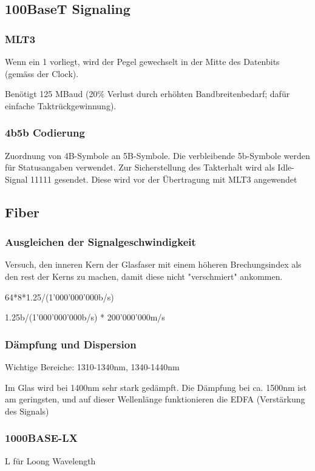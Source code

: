 \begin{multicols}{2}
\subsection{100BaseT Signaling}

\subsubsection{MLT3}
	Wenn ein 1 vorliegt, wird der Pegel gewechselt in der Mitte des Datenbits (gemäss der Clock).
	
	Benötigt 125 MBaud (20\% Verlust durch erhöhten Bandbreitenbedarf; dafür einfache Taktrückgewinnung).
	
\subsubsection{4b5b Codierung}
	Zuordnung von 4B-Symbole an 5B-Symbole. Die verbleibende 5b-Symbole werden für Statusangaben verwendet.
	Zur Sicherstellung des Takterhalt wird als Idle-Signal 11111 gesendet.
	Diese wird vor der Übertragung mit MLT3 angewendet

\subsection{Fiber}

\subsubsection{Ausgleichen der Signalgeschwindigkeit}
	Versuch, den inneren Kern der Glasfaser mit einem höheren Brechungsindex als den rest der Kerns zu machen, damit diese nicht "verschmiert" ankommen.

	64*8*1.25/(1'000'000'000b/s)
	
	1.25b/(1'000'000'000b/s) * 200'000'000m/s
	
	\subsubsection{Dämpfung und Dispersion}
	
	Wichtige Bereiche: 1310-1340nm, 1340-1440nm
	
	Im Glas wird bei 1400nm sehr stark gedämpft. %
	Die Dämpfung bei ca. 1500nm ist am geringsten, und auf dieser Wellenlänge funktionieren die EDFA (Verstärkung des Signals) %

\subsubsection{1000BASE-LX}
	L für Loong Wavelength
	

\end{multicols}

